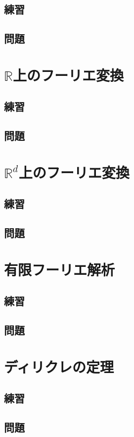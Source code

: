\documentclass[platex]{jsarticle}
\begin{document}
\subsection{練習}
\subsection{問題}

\newpage
\section{$\mathbb{R}$上のフーリエ変換}
\setcounter{subsection}{4}
\subsection{練習}
\subsection{問題}

\newpage
\section{$\mathbb{R}^d$上のフーリエ変換}
\setcounter{subsection}{5}
\subsection{練習}
\subsection{問題}

\newpage
\section{有限フーリエ解析}
\setcounter{subsection}{2}
\subsection{練習}
\subsection{問題}

\newpage
\section{ディリクレの定理}
\setcounter{subsection}{3}
\subsection{練習}
\subsection{問題}
\end{document}
